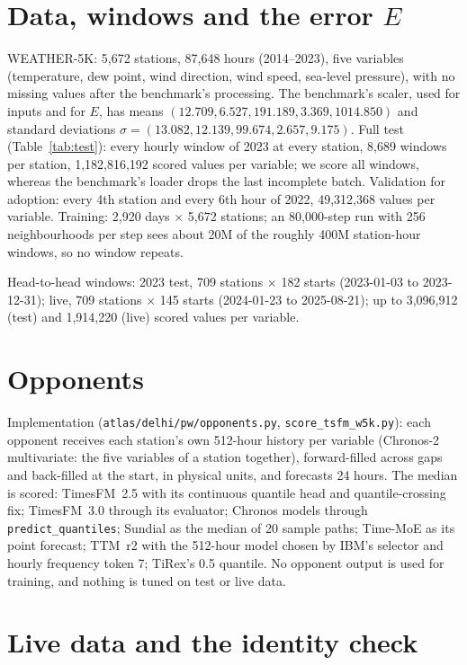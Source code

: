 \documentclass{article}
\begin{document}
\section{Data, windows and the error $E$}
\label{app:data}

WEATHER-5K: 5,672 stations, 87,648 hours (2014--2023), five variables (temperature, dew point, wind direction, wind
speed, sea-level pressure), with no missing values after the benchmark's processing. The benchmark's scaler, used for
inputs and for $E$, has means $(12.709, 6.527, 191.189, 3.369, 1014.850)$ and standard deviations
$\sigma=(13.082, 12.139, 99.674, 2.657, 9.175)$. Full test (Table~\ref{tab:test}): every hourly window of 2023 at every
station, 8,689 windows per station, 1,182,816,192 scored values per variable; we score all windows, whereas the
benchmark's loader drops the last incomplete batch. Validation for adoption: every 4th station and every 6th hour of
2022, 49,312,368 values per variable. Training: 2,920 days $\times$ 5,672 stations; an 80,000-step run with 256
neighbourhoods per step sees about 20M of the roughly 400M station-hour windows, so no window repeats.

Head-to-head windows: 2023 test, 709 stations $\times$ 182 starts (2023-01-03 to 2023-12-31); live, 709 stations
$\times$ 145 starts (2024-01-23 to 2025-08-21); up to 3,096,912 (test) and 1,914,220 (live) scored values per variable.

\section{Opponents}
\label{app:opp}



Implementation (\texttt{atlas/delhi/pw/opponents.py}, \texttt{score\_tsfm\_w5k.py}): each opponent receives each
station's own 512-hour history per variable (Chronos-2 multivariate: the five variables of a station together),
forward-filled across gaps and back-filled at the start, in physical units, and forecasts 24 hours. The median is
scored: TimesFM~2.5 with its continuous quantile head and quantile-crossing fix; TimesFM~3.0 through its evaluator;
Chronos models through \texttt{predict\_quantiles}; Sundial as the median of 20 sample paths; Time-MoE as its point
forecast; TTM~r2 with the 512-hour model chosen by IBM's selector and hourly frequency token 7; TiRex's 0.5 quantile.
No opponent output is used for training, and nothing is tuned on test or live data.

\section{Live data and the identity check}
\label{app:live}
\end{document}
